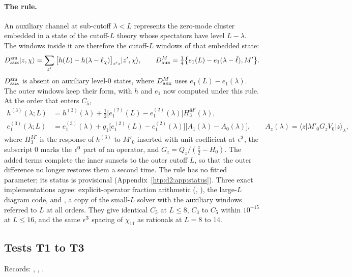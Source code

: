 \paragraph{The rule.} An auxiliary channel at sub-cutoff $\lambda<L$ represents the zero-mode cluster embedded in a state of
the cutoff-$L$ theory whose spectators have level $L-\lambda$. The windows inside it are therefore the cutoff-$L$ windows of
that embedded state:
\begin{equation}
 D^{\rm zm}_{\rm aux}|z,\chi\rangle=\sum_{z'}\big[h(L)-h(\lambda-\ell_\chi)\big]_{z'z}|z',\chi\rangle,\qquad
 D^M_{\rm aux}=\tfrac14\big\{e_1(L)-e_1(\lambda-\hat\ell),M'\big\}.
\end{equation}
$D^{\rm zm}_{\rm aux}$ is absent on auxiliary level-0 states, where $D^M_{\rm aux}$ uses $e_1(L)-e_1(\lambda)$. The outer
windows keep their form, with $h$ and $e_1$ now computed under this rule. At the order that enters $C_5$,
\begin{align}
 h^{(3)}(\lambda;L)&=h^{(3)}(\lambda)+\tfrac12\big[e_1^{(2)}(L)-e_1^{(2)}(\lambda)\big]H_3^{M'}(\lambda),\nonumber\\
 e_1^{(3)}(\lambda;L)&=e_1^{(3)}(\lambda)+g_1\big[e_1^{(2)}(L)-e_1^{(2)}(\lambda)\big]\big[A_1(\lambda)-A_0(\lambda)\big],\qquad
 A_z(\lambda)=\langle z|M'_0G_zV_0|z\rangle_\lambda ,
\end{align}
where $H_3^{M'}$ is the response of $h^{(3)}$ to $M'_0$ inserted with unit coefficient at $\epsilon^2$, the subscript 0 marks the
$\epsilon^0$ part of an operator, and $G_z=Q_z/(\frac z2-H_0)$. The added terms complete the inner sunsets to the outer cutoff
$L$, so that the outer difference no longer restores them a second time. The rule has no fitted parameter; its status is provisional (Appendix~\ref{htp:d2:app:status}). Three exact
implementations agree: explicit-operator fraction arithmetic (, ), the large-$L$
diagram code, and , a copy of the small-$L$ solver with the auxiliary windows referred to $L$ at all orders.
They give identical $C_5$ at $L\le8$, $C_3$ to $C_5$ within $10^{-15}$ at $L\le16$, and the same $\epsilon^3$ spacing of
$\chi_{11}$ as rationals at $L=8$ to 14.

\subsection{Tests T1 to T3}\label{htp:d2:app:tests}
{\small\raggedright\noindent Records: , ,
.\par}

